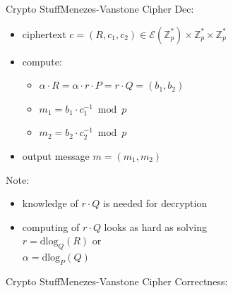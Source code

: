 \begin{frame}{Crypto Stuff}{Menezes-Vanstone Cipher}
    Dec:
    \begin{itemize}
        \item ciphertext $c = (R, c_1, c_2) \in \mathcal{E}(\mathbb{Z}_p^*) \times \mathbb{Z}_p^* \times \mathbb{Z}_p^*$
        \item compute:
            \begin{itemize}
                \item $\alpha \cdot R = \alpha \cdot r \cdot P = r \cdot Q = (b_1,b_2)$
                \item $m_1 = b_1 \cdot c_1^{-1} \bmod p$
                \item $m_2 = b_2 \cdot c_2^{-1} \bmod p$
            \end{itemize}
        \item output message $m = (m_1, m_2)$
    \end{itemize}
    Note:
    \begin{itemize}
        \item knowledge of $r \cdot Q$ is needed for decryption
        \item computing of $r \cdot Q$ looks as hard as solving\\
              $r = \text{dlog}_Q(R)$ or \\
              $\alpha = \text{dlog}_P(Q)$
    \end{itemize}

\end{frame}

\begin{frame}{Crypto Stuff}{Menezes-Vanstone Cipher}
    Correctness:

\end{frame}

